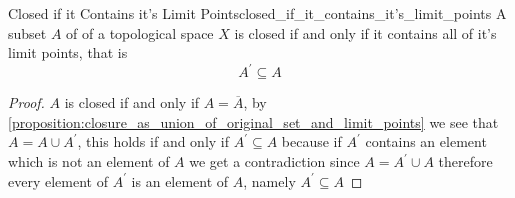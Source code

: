 \begin{proposition}{Closed if it Contains it's Limit Points}{closed_if_it_contains_it's_limit_points}
A subset \( A \) of of a topological space \( X \) is closed if and only if it
contains all of it's limit points, that is 
\[
A ^{ \prime  } \subseteq A
\]
\end{proposition}
\begin{proof}
    \( A \) is closed if and only if \( A = \overline{A}  \), by
    \ref{proposition:closure_as_union_of_original_set_and_limit_points} we see
    that \( A =  A \cup  A ^{ \prime  } \), this holds if and only if \( A ^{
    \prime  } \subseteq A \) because if \( A ^{ \prime  }  \) contains an
    element which is not an element of \( A \) we get a contradiction since \( A
    =  A ^{ \prime  } \cup  A\)  therefore every element of \( A ^{ \prime  }
    \) is an element of \( A \), namely \( A ^{ \prime  } \subseteq A \) 
\end{proof}
